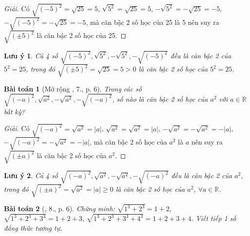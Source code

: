 \documentclass{article}
\newtheorem{baitoan}{Bài toán}
\newtheorem{luuy}{Lưu ý}
\begin{document}
\begin{proof}[Giải]
	Có $\sqrt{(-5)^2} = \sqrt{25} = 5$, $\sqrt{5^2} = \sqrt{25} = 5$, $-\sqrt{5^2} = -\sqrt{25} = -5$, $-\sqrt{(-5)^2} = -\sqrt{25} = -5$, mà căn bậc 2 số học của 25 là 5 nên suy ra $\sqrt{(\pm5)^2}$ là căn bậc 2 số học của 25.
\end{proof}

\begin{luuy}
	Cả 4 số $\sqrt{(-5)^2},\sqrt{5^2},-\sqrt{5^2},-\sqrt{(-5)^2}$ đều là căn bậc 2 của $5^2 = 25$, trong đó $\sqrt{(\pm5)^2} = \sqrt{25} = 5 > 0$ là căn bậc 2 số học của $5^2 = 25$.
\end{luuy}

\begin{baitoan}[Mở rộng \cite{SBT_Toan_9_tap_1}, 7., p. 6]
	Trong các số $\sqrt{(-a)^2},\sqrt{a^2},-\sqrt{a^2},-\sqrt{(-a)^2}$, số nào là căn bậc 2 số học của $a^2$ với $a\in\mathbb{R}$ bất kỳ?
\end{baitoan}

\begin{proof}[Giải]
	Có $\sqrt{(-a)^2} = \sqrt{a^2} = |a|$, $\sqrt{a^2} = \sqrt{a^2} = |a|$, $-\sqrt{a^2} = -\sqrt{a^2} = -|a|$, $-\sqrt{(-a)^2} = -\sqrt{a^2} = -|a|$, mà căn bậc 2 số học của $a^2$ là $a$ nên suy ra $\sqrt{(\pm a)^2}$ là căn bậc 2 số học của $a^2$.
\end{proof}

\begin{luuy}
	Cả 4 số $\sqrt{(-a)^2},\sqrt{a^2},-\sqrt{a^2},-\sqrt{(-a)^2}$ đều là căn bậc 2 của $a^2$, trong đó $\sqrt{(\pm a)^2} = \sqrt{a^2} = |a|\ge0$ là căn bậc 2 số học của $a^2$, $\forall a\in\mathbb{R}$.
\end{luuy}

\begin{baitoan}[\cite{SBT_Toan_9_tap_1}, 8., p. 6]
	Chứng minh: $\sqrt{1^3 + 2^3} = 1 + 2$, $\sqrt{1^3 + 2^3 + 3^3} = 1 + 2 + 3$, $\sqrt{1^3 + 2^3 + 3^3 + 4^3} = 1 + 2 + 3 + 4$. Viết tiếp 1 số đẳng thức tương tự. 
\end{baitoan}
\end{document}
